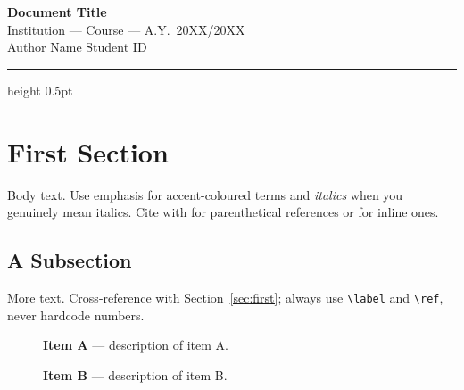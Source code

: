 \documentclass[10pt,a4paper]{scrartcl}
\renewcommand{\emph}[1]{\textcolor{accent}{#1}}
\newcommand{\RuleSection}[1]{%
    \section{#1}%
    \vspace{0.2em}{\color{accent!35}\hrule height 0.4pt}\vspace{0.3em}%
  }
\begin{document}

  \begin{center}
    {\Huge\bfseries\color{accent} Document Title}\\[0.25cm]
    {\small Institution --- Course --- A.Y.\ 20XX/20XX}\\[0.15cm]
    {\small Author Name \quad\textbullet\quad Student ID}\\[0.2cm]
    {\color{accent!35}\hrule height 0.5pt}
  \end{center}

  \vspace{0.3em}

  \begin{abstract}
  \noindent
  Abstract text goes here.
  \end{abstract}


  \RuleSection{First Section}
  \label{sec:first}

  Body text. Use \emph{emphasis} for accent-coloured terms and \textit{italics}
  when you genuinely mean italics. Cite with \citep{key} for parenthetical
  references \citep{example} or \citet{key} for inline ones.

  \subsection{A Subsection}
  \label{sec:sub}

  More text. Cross-reference with Section~\ref{sec:first}; always use
  \verb|\label| and \verb|\ref|, never hardcode numbers.

  \begin{description}
    \item[] \textbf{Item A} --- description of item A.
    \item[] \textbf{Item B} --- description of item B.
  \end{description}
\end{document}
